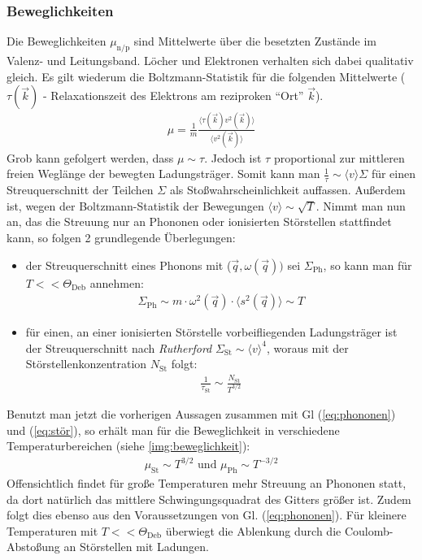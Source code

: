\documentclass[numbers=noenddot,14pt,a4paper]{scrartcl}
\newcommand{\ix}[1]{_\text{#1}}
\newcommand{\tilt}[1]{\textit{#1}}
\begin{document}
\subsubsection{Beweglichkeiten}
Die Beweglichkeiten $\mu\ix{n/p}$ sind Mittelwerte über die besetzten Zustände im Valenz- und Leitungsband. Löcher und Elektronen verhalten sich dabei qualitativ gleich. Es gilt wiederum die Boltzmann-Statistik für die folgenden Mittelwerte ($\tau(\vec{k})$ - Relaxationszeit  des Elektrons am reziproken "`Ort"' $\vec{k}$).
\begin{align}
	\mu=\frac{1}{m}\frac{\langle\tau(\vec{k}) v^2(\vec{k})\rangle}{\langle v^2(\vec{k})\rangle}
\end{align}
Grob kann gefolgert werden, dass $\mu\sim\tau$. Jedoch ist $\tau$ proportional zur mittleren freien Weglänge der bewegten Ladungsträger. Somit kann man $\frac{1}{\tau}\sim\langle v\rangle\Sigma$ für einen Streuquerschnitt der Teilchen $\Sigma$ als Stoßwahrscheinlichkeit auffassen. Außerdem ist, wegen der Boltzmann-Statistik der Bewegungen \mbox{$\langle v\rangle\sim\sqrt{T}$.} Nimmt man nun an, das die Streuung nur an Phononen oder ionisierten Störstellen stattfindet kann, so folgen 2 grundlegende Überlegungen:
\begin{itemize}
	\item{der Streuquerschnitt eines Phonons mit ($\vec{q},\omega(\vec{q}))$ sei $\Sigma\ix{Ph}$, so kann man für $T<<\Theta\ix{Deb}$ annehmen:}
	\begin{align}
		\Sigma\ix{Ph}\sim m\cdot\omega^2(\vec{q})\cdot\langle s^2(\vec{q})\rangle\sim T \label{eq:phononen}
	\end{align}
	\item{für einen, an einer ionisierten Störstelle vorbeifliegenden Ladungsträger ist der Streuquerschnitt nach \tilt{Rutherford} $\Sigma\ix{St}\sim \langle v\rangle^4$, woraus mit der Störstellenkonzentration $N\ix{St}$ folgt:}
	\begin{align}
		\frac{1}{\tau\ix{St}}\sim \frac{N\ix{St}}{T^{3/2}} \label{eq:stör}
	\end{align}
\end{itemize}
Benutzt man jetzt die vorherigen Aussagen zusammen mit Gl (\ref{eq:phononen}) und (\ref{eq:stör}), so erhält man für die Beweglichkeit in verschiedene Temperaturbereichen (siehe \ref{img:beweglichkeit}):
\begin{align}
	\mu\ix{St}\sim T^{3/2} \,\, \text{und} \,\, \mu\ix{Ph}\sim T^{-3/2} \label{eq:beweg2}
\end{align}
Offensichtlich findet für große Temperaturen mehr Streuung an Phononen statt, da dort natürlich das mittlere Schwingungsquadrat des Gitters größer ist. Zudem folgt dies ebenso aus den Voraussetzungen von Gl. (\ref{eq:phononen}). Für kleinere Temperaturen mit $T<<\Theta\ix{Deb}$ überwiegt die Ablenkung durch die Coulomb-Abstoßung an Störstellen mit Ladungen.
\end{document}
